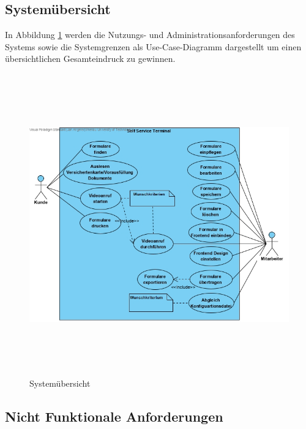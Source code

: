     \newpage
    
\subsection{Systemübersicht}

In Abbildung \ref{fig:UseCase} werden die Nutzungs- und Administrationsanforderungen des Systems sowie die Systemgrenzen als Use-Case-Diagramm dargestellt um einen übersichtlichen Gesamteindruck zu gewinnen.
\vspace{1cm}

\begin{figure}[htp]
    \centering
    \includegraphics[width=15cm , height=13cm]{Kapitel/Bilder/USeCasev2.jpg}
    \caption{Systemübersicht}
    \label{fig:UseCase}
\end{figure}
\newpage

\subsection{Nicht Funktionale Anforderungen}

\vspace{1cm}

